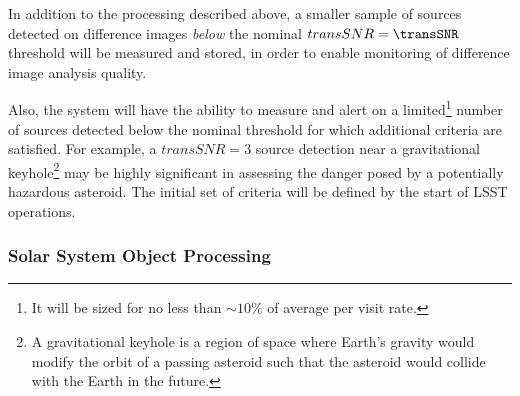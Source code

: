 \documentclass[SE,lsstdraft,toc]{lsstdoc}
\newcommand{\marginreq}[1]{\marginpar{\hspace{0pt}\tiny #1}}
\newcommand{\dmreq}[1]{\marginreq{DMS-REQ-#1}}
\newcommand{\reqparam}[1]{\marginreq{#1}}
\begin{document}
In addition to the processing described above, a smaller sample of sources detected on difference images \emph{below} the nominal $transSNR = \transSNR$ \reqparam{transSNR} threshold will be measured and stored, in order to enable monitoring of difference image analysis quality.\dmreq{0270}

Also, the system will have the ability to measure and alert on a limited\footnote{It will be sized for no less than $\sim 10\%$ of average \DIASource per visit rate.} number of sources detected below the nominal threshold for which additional criteria are satisfied. For example, a $transSNR = 3$ source detection near a gravitational keyhole\footnote{
A gravitational keyhole is a region of space where Earth's gravity would modify the orbit of a passing asteroid
such that the asteroid would collide with the Earth in the future.}
may be highly significant in assessing the danger posed by a potentially hazardous asteroid.
The initial set of criteria will be defined by the start of LSST operations.

\subsubsection{Solar System Object Processing}
\label{sec:ssProcessing}
\end{document}
